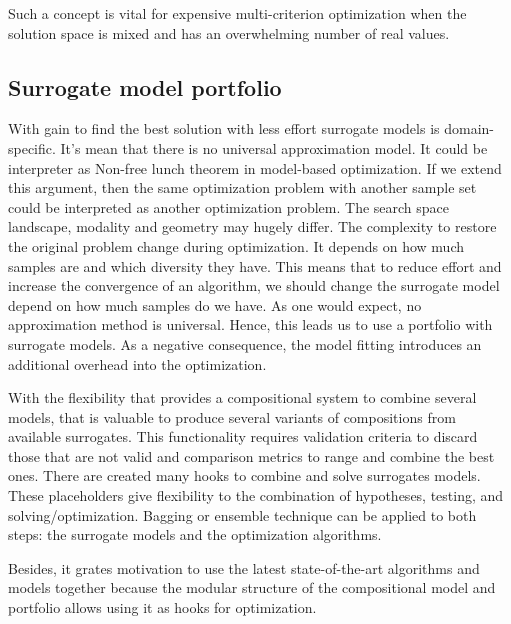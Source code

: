             Such a concept is vital for expensive multi-criterion optimization when the solution space is mixed and has an overwhelming number of real values. 
            
        
        \subsection{Surrogate model portfolio}
            With gain to find the best solution with less effort surrogate models is domain-specific. It's mean that there is no universal approximation model. It could be interpreter as Non-free lunch theorem in model-based optimization. If we extend this argument, then the same optimization problem with another sample set could be interpreted as another optimization problem. The search space landscape, modality and geometry may hugely differ. The complexity to restore the original problem change during optimization. It depends on how much samples are and which diversity they have.
            This means that to reduce effort and increase the convergence of an algorithm, we should change the surrogate model depend on how much samples do we have. As one would expect, no approximation method is universal. Hence, this leads us to use a portfolio with surrogate models. As a negative consequence, the model fitting introduces an additional overhead into the optimization. 
        
            With the flexibility that provides a compositional system to combine several models, that is valuable to produce several variants of compositions from available surrogates. This functionality requires validation criteria to discard those that are not valid and comparison metrics to range and combine the best ones. There are created many hooks to combine and solve surrogates models. These placeholders give flexibility to the combination of hypotheses, testing, and solving/optimization. Bagging or ensemble technique can be applied to both steps: the surrogate models and the optimization algorithms.

            Besides, it grates motivation to use the latest state-of-the-art algorithms and models together because the modular structure of the compositional model and portfolio allows using it as hooks for optimization.  

